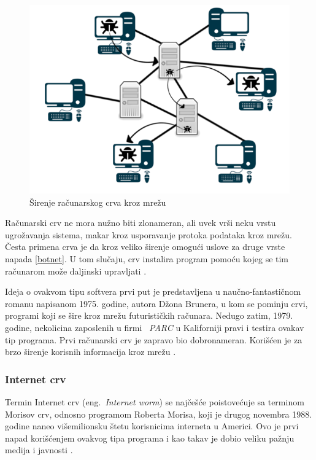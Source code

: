 \documentclass[a4paper]{article}
\begin{document}
\begin{figure}[h!]
\begin{center}
\includegraphics[scale=0.35]{worms.png}
\end{center}
\caption{Širenje računarskog crva kroz mrežu}
\label{fig:crvsirenje}
\end{figure}

Računarski crv ne mora nužno biti zlonameran, ali uvek vrši neku vrstu ugrožavanja sistema, makar kroz usporavanje protoka podataka kroz mrežu. Česta primena crva je da kroz veliko širenje omogući uslove za druge vrste napada \ref{botnet}. U tom slučaju, crv instalira program pomoću kojeg se tim računarom može daljinski upravljati \cite{ethics}.

Ideja o ovakvom tipu softvera prvi put je predstavljena u naučno-fantastičnom romanu napisanom 1975. godine, autora Džona Brunera, u kom se pominju crvi, programi koji se šire kroz mrežu futurističkih računara. Nedugo zatim, 1979. godine, nekolicina zaposlenih u firmi ~{\em PARC} u Kaliforniji pravi i testira ovakav tip programa.
Prvi računarski crv je zapravo bio dobronameran. Korišćen je za brzo širenje korisnih informacija kroz mrežu \cite{internet_worm}. 


\subsubsection{Internet crv}

Termin Internet crv  (eng.~{\em Internet worm}) se najčešće poistovećuje sa terminom Morisov crv, odnosno programom Roberta Morisa, koji je drugog novembra 1988. godine naneo višemilionsku štetu korisnicima interneta u Americi. Ovo je prvi napad korišćenjem ovakvog tipa programa i kao takav je dobio veliku pažnju medija i javnosti \cite{ethics}.
\end{document}
